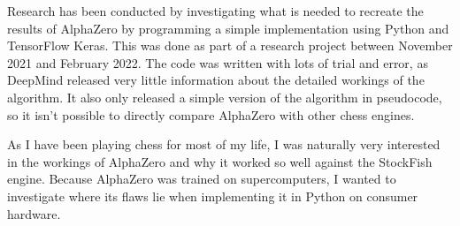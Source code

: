 \documentclass{article}
\begin{document}
Research has been conducted by investigating what is needed to recreate the results of AlphaZero
by programming a simple implementation using Python and TensorFlow Keras. This was done as part of a research project
between November 2021 and February 2022. The code was written with lots of trial and error, as DeepMind released 
very little information about the detailed workings of the algorithm. It also only released a simple version of 
the algorithm in pseudocode, so it isn't possible to directly compare AlphaZero with other chess engines.

As I have been playing chess for most of my life, I was naturally very interested in the workings of AlphaZero
and why it worked so well against the StockFish engine. Because AlphaZero was trained on supercomputers, 
I wanted to investigate where its flaws lie when implementing it in Python on consumer hardware.



\newpage
\end{document}
